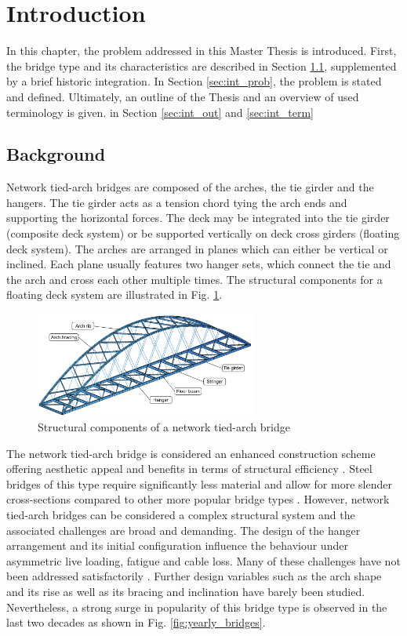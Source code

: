 \section{Introduction}\label{sec:intro}
In this chapter, the problem addressed in this Master Thesis is introduced. First, the bridge type and its characteristics are described in Section \ref{sec:int_back}, supplemented by a brief historic integration. In Section \ref{sec:int_prob}, the problem is stated and defined. Ultimately, an outline of the Thesis and an overview of used terminology is given. in Section \ref{sec:int_out} and \ref{sec:int_term} 

\subsection{Background}\label{sec:int_back}
Network tied-arch bridges are composed of the arches, the tie girder and the hangers. The tie girder acts as a tension chord tying the arch ends and supporting the horizontal forces. The deck may be integrated into the tie girder (composite deck system) or be supported vertically on deck cross girders (floating deck system). The arches are arranged in planes which can either be vertical or inclined. Each plane usually features two hanger sets, which connect the tie and the arch and cross each other multiple times. The structural components for a floating deck system are illustrated in Fig. \ref{fig:components_illustration}.
\begin{figure}[H]
    \centering
    \includegraphics[width=0.65\textwidth]{overleaf/Pictures/illustration_components.PNG}
    \caption{Structural components of a network tied-arch bridge}
    \label{fig:components_illustration}
\end{figure}

The network tied-arch bridge is considered an enhanced construction scheme offering aesthetic appeal and benefits in terms of structural efficiency \cite{Hu}. Steel bridges of this type require significantly less material and allow for more slender cross-sections compared to other more popular bridge types \cite{Herzog}. However, network tied-arch bridges can be considered a complex structural system and the associated challenges are broad and demanding. 
The design of the hanger arrangement and its initial configuration influence the behaviour under asymmetric live loading, fatigue and cable loss. 
Many of these challenges have not been addressed satisfactorily \cite{Bruno}. Further design variables such as the arch shape and its rise as well as its bracing and inclination have barely been studied. Nevertheless, a strong surge in popularity of this bridge type is observed in the last two decades as shown in Fig. \ref{fig:yearly_bridges}.

